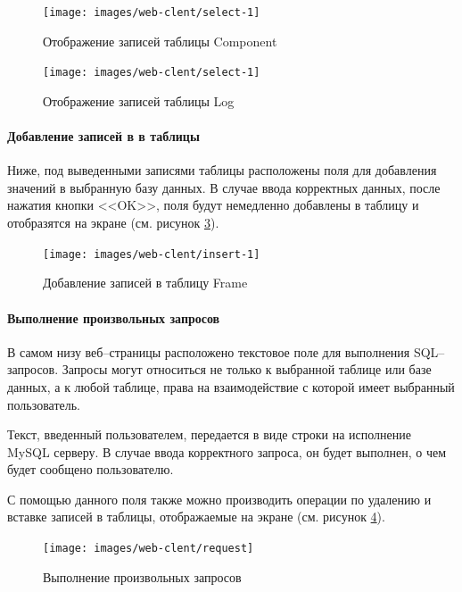 \documentclass[a4paper,14pt]{extarticle}
\begin{document}
\begin{figure}[h!]
	\centering
	\texttt{[image: images/web-clent/select-1]}
	\caption{Отображение записей таблицы Component}
	\label{fig:select-1}
\end{figure}

\begin{figure}[h!]
	\centering
	\texttt{[image: images/web-clent/select-1]}
	\caption{Отображение записей таблицы Log}
	\label{fig:select-log}
\end{figure}



\paragraph{Добавление записей в в таблицы}
Ниже, под выведенными записями таблицы расположены поля для добавления значений в выбранную базу данных. В случае ввода корректных данных, после нажатия кнопки <<OK>>, поля будут немедленно добавлены в таблицу и отобразятся на экране (см. рисунок \ref{fig:insert-1}).

\begin{figure}[h!]
	\centering
	\texttt{[image: images/web-clent/insert-1]}
	\caption{Добавление записей в таблицу Frame}
	\label{fig:insert-1}
\end{figure}


\paragraph{Выполнение произвольных запросов}
В самом низу веб--страницы расположено текстовое поле для выполнения SQL--запросов. Запросы могут относиться не только к выбранной таблице или базе данных, а к любой таблице, права на взаимодействие с которой имеет выбранный пользователь. 

Текст, введенный пользователем, передается в виде строки на исполнение MySQL серверу. В случае ввода корректного запроса, он будет выполнен, о чем будет сообщено пользователю. 

С помощью данного поля также можно производить операции по удалению и вставке записей в таблицы, отображаемые на экране (см. рисунок \ref{fig:request}).

\begin{figure}[h!]
	\centering
	\texttt{[image: images/web-clent/request]}
	\caption{Выполнение произвольных запросов}
	\label{fig:request}
\end{figure}
 








\end{document}

